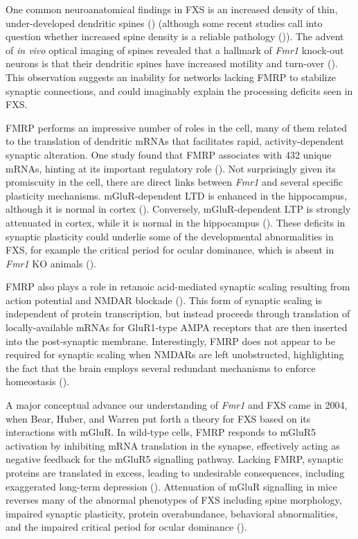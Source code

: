 One common neuroanatomical findings in FXS is an increased density of thin, under-developed dendritic spines (\cite{Hinton1991, Comery1997, Dolen2007, Liu2011}) (although some recent studies call into question whether increased spine density is a reliable pathology (\cite{Cruz-Martin2010, Harlow2010a, Meredith2007})). The advent of \textit{in vivo} optical imaging of spines revealed that a hallmark of \textit{Fmr1} knock-out neurons is that their dendritic spines have increased motility and turn-over (\cite{Cruz-Martin2010, Pan2010}). This observation suggests an inability for networks lacking FMRP to stabilize synaptic connections, and could imaginably explain the processing deficits seen in FXS.

FMRP performs an impressive number of roles in the cell, many of them related to the translation of dendritic mRNAs that facilitates rapid, activity-dependent synaptic alteration. One study found that FMRP associates with 432 unique mRNAs, hinting at its important regulatory role (\cite{Brown2001}). Not surprisingly given its promiscuity in the cell, there are direct links between \textit{Fmr1} and several specific plasticity mechanisms. mGluR-dependent LTD is enhanced in the hippocampus, although it is normal in cortex (\cite{Huber2002}). Conversely, mGluR-dependent LTP is strongly attenuated in cortex, while it is normal in the hippocampus (\cite{Li2002, Zhao2005, Wilson2007}). These deficits in synaptic plasticity could underlie some of the developmental abnormalities in FXS, for example the critical period for ocular dominance, which is absent in \textit{Fmr1} KO animals (\cite{Dolen2007}).

FMRP also plays a role in retanoic acid-mediated synaptic scaling resulting from action potential and NMDAR blockade (\cite{Soden2010}). This form of synaptic scaling is independent of protein transcription, but instead proceeds through translation of locally-available mRNAs for GluR1-type AMPA receptors that are then inserted into the post-synaptic membrane. Interestingly, FMRP does not appear to be required for synaptic scaling when NMDARs are left unobstructed, highlighting the fact that the brain employs several redundant mechanisms to enforce homeostasis (\cite{Soden2010}).

A major conceptual advance our understanding of \textit{Fmr1} and FXS came in 2004, when Bear, Huber, and Warren put forth a theory for FXS based on its interactions with mGluR. In wild-type cells, FMRP responds to mGluR5 activation by inhibiting mRNA translation in the synapse, effectively acting as negative feedback for the mGluR5 signalling pathway. Lacking FMRP, synaptic proteins are translated in excess, leading to undesirable consequences, including exaggerated long-term depression (\cite{Huber2002, Bear2004}). Attenuation of mGluR signalling in mice reverses many of the abnormal phenotypes of FXS including spine morphology, impaired synaptic plasticity, protein overabundance, behavioral abnormalities, and the impaired critical period for ocular dominance (\cite{DeVrij2008, Dolen2007, Su2011}).

